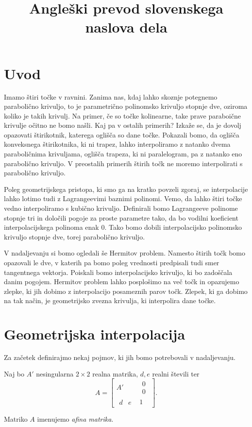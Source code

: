 \documentclass[mat1]{fmfdelo}
\title{Angleški prevod slovenskega naslova dela}
\begin{document}
\section{Uvod}

Imamo štiri točke v ravnini. Zanima nas, kdaj lahko skoznje potegnemo parabolično krivuljo, to je parametrično polinomsko krivuljo stopnje dve, oziroma koliko je takih krivulj. Na primer, če so točke kolinearne, take prave paraboične krivulje očitno ne bomo našli. Kaj pa v ostalih primerih? Izkaže se, da je dovolj opazovati štirikotnik, katerega oglišča so dane točke. Pokazali bomo, da oglišča konveksnega štirikotnika, ki ni trapez, lahko interpoliramo z natanko dvema paraboličnima krivuljama, oglišča trapeza, ki ni paralelogram, pa z natanko eno parabolično krivuljo. V preostalih primerih štirih točk ne moremo interpolirati s parabolično krivuljo.

Poleg geometrijskega pristopa, ki smo ga na kratko povzeli zgoraj, se interpolacije lahko lotimo tudi z Lagrangeevimi baznimi polinomi. Vemo, da lahko štiri točke vedno interpoliramo s kubično krivuljo. Definirali bomo Lagrangeeve polinome stopnje tri in določili pogoje za proste parametre tako, da bo vodilni koeficient interpolacijskega polinoma enak $0$. Tako bomo dobili interpolacijsko polinomsko krivuljo stopnje dve, torej parabolično krivuljo.

V nadaljevanju si bomo ogledali še Hermitov problem. Namesto štirih točk bomo opazovali le dve, v katerih pa bomo poleg vrednosti predpisali tudi smer tangentnega vektorja. Poiskali bomo interpolacijsko krivuljo, ki bo zadoščala danim pogojem. Hermitov problem lahko posplošimo na več točk in opazujemo zlepke, ki jih dobimo z interpolacijo posameznih parov točk. Zlepek, ki ga dobimo na tak način, je geometrijsko zvezna krivulja, ki interpolira dane točke. 

\section{Geometrijska interpolacija}

Za začetek definirajmo nekaj pojmov, ki jih bomo potrebovali v nadaljevanju.

\begin{definicija}
Naj bo $A'$ nesingularna $2\times2$ realna matrika, $d, e$ realni števili ter 
$$ A = 
\begin{bmatrix}
A' &
\begin{matrix}
0 \\
0
\end{matrix}
\\
\begin{matrix}
d & e
\end{matrix}
 & 1
\end{bmatrix}
.$$

Matriko $A$ imenujemo \emph{afina matrika}. 
\end{definicija}
\end{document}
